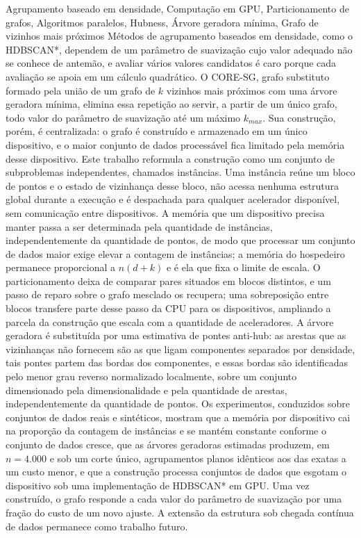 \documentclass[dissertmst]{ufscar}
\newcommand{\kmax}{k_{max}}
\begin{document}
\begin{resumo}{Agrupamento baseado em densidade, Computação em GPU, Particionamento de grafos, Algoritmos paralelos, Hubness, Árvore geradora mínima, Grafo de vizinhos mais próximos}
    Métodos de agrupamento baseados em densidade, como o HDBSCAN*, dependem de um parâmetro de suavização cujo valor adequado não se conhece de antemão, e avaliar vários valores candidatos é caro porque cada avaliação se apoia em um cálculo quadrático. O CORE-SG, grafo substituto formado pela união de um grafo de $k$ vizinhos mais próximos com uma árvore geradora mínima, elimina essa repetição ao servir, a partir de um único grafo, todo valor do parâmetro de suavização até um máximo $\kmax$. Sua construção, porém, é centralizada: o grafo é construído e armazenado em um único dispositivo, e o maior conjunto de dados processável fica limitado pela memória desse dispositivo. Este trabalho reformula a construção como um conjunto de subproblemas independentes, chamados instâncias. Uma instância reúne um bloco de pontos e o estado de vizinhança desse bloco, não acessa nenhuma estrutura global durante a execução e é despachada para qualquer acelerador disponível, sem comunicação entre dispositivos. A memória que um dispositivo precisa manter passa a ser determinada pela quantidade de instâncias, independentemente da quantidade de pontos, de modo que processar um conjunto de dados maior exige elevar a contagem de instâncias; a memória do hospedeiro permanece proporcional a $n(d+k)$ e é ela que fixa o limite de escala. O particionamento deixa de comparar pares situados em blocos distintos, e um passo de reparo sobre o grafo mesclado os recupera; uma sobreposição entre blocos transfere parte desse passo da CPU para os dispositivos, ampliando a parcela da construção que escala com a quantidade de aceleradores. A árvore geradora é substituída por uma estimativa de pontes anti-hub: as arestas que as vizinhanças não fornecem são as que ligam componentes separados por densidade, tais pontes partem das bordas dos componentes, e essas bordas são identificadas pelo menor grau reverso normalizado localmente, sobre um conjunto dimensionado pela dimensionalidade e pela quantidade de arestas, independentemente da quantidade de pontos. Os experimentos, conduzidos sobre conjuntos de dados reais e sintéticos, mostram que a memória por dispositivo cai na proporção da contagem de instâncias e se mantém constante conforme o conjunto de dados cresce, que as árvores geradoras estimadas produzem, em $n = 4.000$ e sob um corte único, agrupamentos planos idênticos aos das exatas a um custo menor, e que a construção processa conjuntos de dados que esgotam o dispositivo sob uma implementação de HDBSCAN* em GPU. Uma vez construído, o grafo responde a cada valor do parâmetro de suavização por uma fração do custo de um novo ajuste. A extensão da estrutura sob chegada contínua de dados permanece como trabalho futuro.
\end{resumo}
\end{document}
